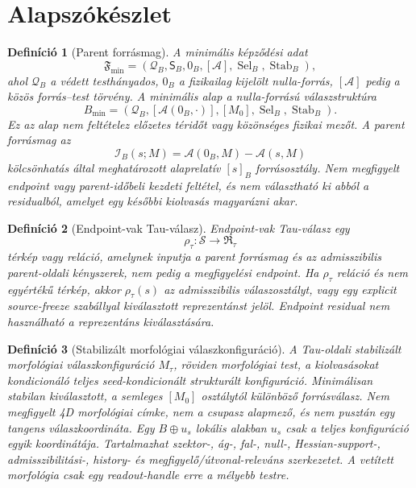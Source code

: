 \documentclass[12pt]{article}
\newtheorem{definition}{Definíció}
\newcommand{\Ssrc}{\mathcal S}
\newcommand{\RTspace}{\mathfrak R_{\tau}}
\newcommand{\Rmap}{\rho_{\tau}}
\newcommand{\Mta}{M_{\tau}}
\begin{document}
\section{Alapszókészlet}

\begin{definition}[Parent forrásmag]
A minimális képződési adat
\[
 \mathfrak F_{\min}=(\mathcal Q_B,\mathsf S_B,0_B,[\mathcal A],
 \operatorname{Sel}_B,\operatorname{Stab}_B),
\]
ahol $\mathcal Q_B$ a védett testhányados, $0_B$ a fizikailag kijelölt
nulla-forrás, $[\mathcal A]$ pedig a közös forrás--test törvény.  A minimális
alap a nulla-forrású válaszstruktúra
\[
 B_{\min}=(\mathcal Q_B,[\mathcal A(0_B,\cdot)],[M_0],
 \operatorname{Sel}_B,\operatorname{Stab}_B).
\]
Ez az alap nem feltételez előzetes téridőt vagy közönséges fizikai mezőt.
A parent forrásmag az
\[
 \mathcal I_B(s;M)=\mathcal A(0_B,M)-\mathcal A(s,M)
\]
kölcsönhatás által meghatározott alaprelatív $[s]_B$ forrásosztály.  Nem
megfigyelt endpoint vagy parent-időbeli kezdeti feltétel, és nem választható ki
abból a residualból, amelyet egy későbbi kiolvasás magyarázni akar.
\end{definition}

\begin{definition}[Endpoint-vak Tau-válasz]
Endpoint-vak Tau-válasz egy
\[
  \Rmap:\Ssrc\to\RTspace
\]
térkép vagy reláció, amelynek inputja a parent forrásmag és az admisszibilis
parent-oldali kényszerek, nem pedig a megfigyelési endpoint.
Ha \(\Rmap\) reláció és nem egyértékű térkép, akkor \(\Rmap(s)\) az
admisszibilis válaszosztályt, vagy egy explicit source-freeze szabállyal
kiválasztott reprezentánst jelöl.  Endpoint residual nem használható a
reprezentáns kiválasztására.
\end{definition}

\begin{definition}[Stabilizált morfológiai válaszkonfiguráció]
A Tau-oldali stabilizált morfológiai válaszkonfiguráció \(\Mta\), röviden
\emph{morfológiai test}, a kiolvasásokat kondicionáló teljes seed-kondicionált
strukturált konfiguráció. Minimálisan stabilan kiválasztott, a semleges
$[M_0]$ osztálytól különböző forrásválasz.  Nem megfigyelt 4D morfológiai
címke, nem a csupasz alapmező, és nem pusztán egy tangens válaszkoordináta.
Egy $B\oplus u_s$ lokális alakban $u_s$ csak a teljes konfiguráció egyik
koordinátája. Tartalmazhat
szektor-, ág-, fal-, null-, Hessian-support-, admisszibilitási-, history- és
megfigyelő/útvonal-releváns szerkezetet.  A vetített morfológia csak egy
readout-handle erre a mélyebb testre.
\end{definition}
\end{document}
